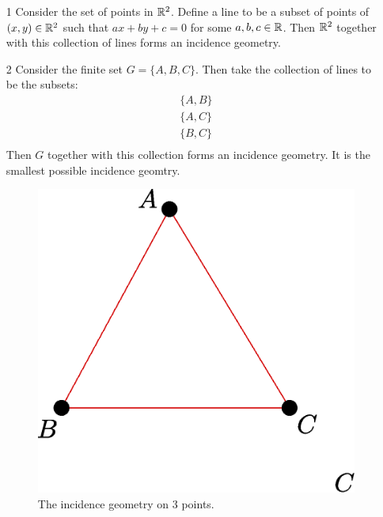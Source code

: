 \begin{example}\label{1.1}
    \begin{enumerate}
        \item[1] Consider the set of points in $\mathbb{R}^2$. Define a line to be a
            subset of points of $(x,y) \in \mathbb{R}^2$ such that $ax+by+c=0$ for some
             $a,b,c \in \mathbb{R}$. Then  $\mathbb{R}^2$ together with this collection of lines
             forms an incidence geometry.

         \item[2] Consider the finite set $G=\{A,B,C\}$. Then take the
             collection of lines to be the subsets:
             \begin{align*}
                 \{A,B\} \\
                 \{A,C\} \\
                 \{B,C\} \\
             \end{align*}
             Then $G$ together with this collection forms an incidence geometry.
             It is the smallest possible incidence geomtry.
             \begin{figure}[h]
                 \centering
                 \includegraphics[scale=0.5]{Figures/Chapter1/incidence_3.eps}
                 \caption{The incidence geometry on $3$ points.}
                 \label{fig_1.1}
             \end{figure}
    \end{enumerate}
\end{example}

